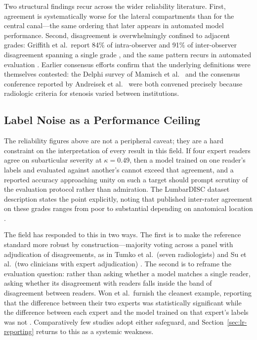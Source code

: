 Two structural findings recur across the wider reliability literature. First,
agreement is systematically worse for the lateral compartments than for the
central canal---the same ordering that later appears in automated model
performance. Second, disagreement is overwhelmingly confined to adjacent
grades: Griffith et al.\ report 84\% of intra-observer and 91\% of
inter-observer disagreement spanning a single grade
\cite{griffith2007modified}, and the same pattern recurs in automated
evaluation \cite{mcsweeney2023external,udomluck2026multitask}. Earlier consensus
efforts confirm that the underlying definitions were themselves contested: the
Delphi survey of Mamisch et al.\ \cite{mamisch2012radiologic} and the consensus
conference reported by Andreisek et al.\ \cite{andreisek2014consensus} were both
convened precisely because radiologic criteria for stenosis varied between
institutions.

\subsection{Label Noise as a Performance Ceiling}
\label{sec:lr-label-ceiling}

The reliability figures above are not a peripheral caveat; they are a hard
constraint on the interpretation of every result in this field. If four expert
readers agree on subarticular severity at $\kappa = 0.49$, then a model trained
on one reader's labels and evaluated against another's cannot exceed that
agreement, and a reported accuracy approaching unity on such a target should
prompt scrutiny of the evaluation protocol rather than admiration. The
LumbarDISC dataset description states the point explicitly, noting that
published inter-rater agreement on these grades ranges from poor to substantial
depending on anatomical location \cite{richards2026the}.

The field has responded to this in two ways. The first is to make the reference
standard more robust by construction---majority voting across a panel with
adjudication of disagreements, as in Tumko et al.\ (seven radiologists)
\cite{tumko2024a} and Su et al.\ (two clinicians with expert adjudication)
\cite{su2022automatic}. The second is to reframe the evaluation question: rather
than asking whether a model matches a single reader, asking whether its
disagreement with readers falls inside the band of disagreement between readers.
Won et al.\ furnish the cleanest example, reporting that the difference between
their two experts was statistically significant while the difference between
each expert and the model trained on that expert's labels was not
\cite{won2020spinal}. Comparatively few studies adopt either safeguard, and
Section~\ref{sec:lr-reporting} returns to this as a systemic weakness.

